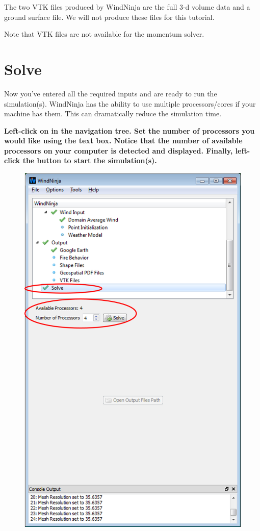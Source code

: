 \documentclass[12pt]{article}
\begin{document}
The two VTK files produced by WindNinja are the full 3-d volume data and a ground surface file.  We will not produce these files for this tutorial.

Note that VTK files are not available for the momentum solver.

\section{Solve}

Now you've entered all the required inputs and are ready to run the simulation(s).  WindNinja has the ability to use multiple processors/cores if your machine has them.  This can dramatically reduce the simulation time.

\textbf{\color{red} Left-click on  in the navigation tree.  Set the number of processors you would like using the  text box.  Notice that the number of available processors on your computer is detected and displayed.  Finally, left-click the  button to start the simulation(s).}

\begin{figure}[H]
	\label{}
	\centering
	\includegraphics[scale=1.0]{solve_1}
\end{figure}
\end{document}
